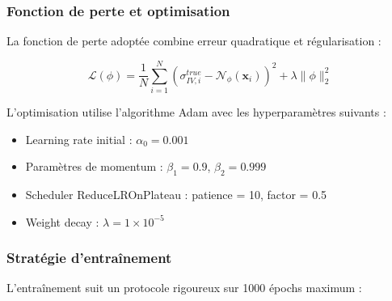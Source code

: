 \subsubsection{Fonction de perte et optimisation}

La fonction de perte adoptée combine erreur quadratique et régularisation :

\begin{equation}
\mathcal{L}(\phi) = \frac{1}{N} \sum_{i=1}^{N} \left(\sigma_{IV,i}^{true} - \mathcal{N}_\phi(\boldsymbol{x}_i)\right)^2 + \lambda \|\phi\|_2^2
\end{equation}

L'optimisation utilise l'algorithme Adam \citep{kingma2014adam} avec les hyperparamètres suivants :
\begin{itemize}
\item Learning rate initial : $\alpha_0 = 0.001$
\item Paramètres de momentum : $\beta_1 = 0.9$, $\beta_2 = 0.999$
\item Scheduler ReduceLROnPlateau : patience = 10, factor = 0.5
\item Weight decay : $\lambda = 1 \times 10^{-5}$
\end{itemize}

\subsubsection{Stratégie d'entraînement}

L'entraînement suit un protocole rigoureux sur 1000 épochs maximum :


